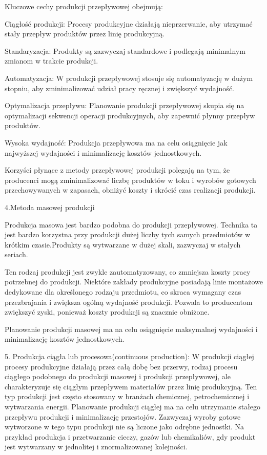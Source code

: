 Kluczowe cechy produkcji przepływowej obejmują:

    Ciągłość produkcji: Procesy produkcyjne działają nieprzerwanie, aby utrzymać stały przepływ produktów przez linię produkcyjną.

    Standaryzacja: Produkty są zazwyczaj standardowe i podlegają minimalnym zmianom w trakcie produkcji.

    Automatyzacja: W produkcji przepływowej stosuje się automatyzację w dużym stopniu, aby zminimalizować udział pracy ręcznej i zwiększyć wydajność.

    Optymalizacja przepływu: Planowanie produkcji przepływowej skupia się na optymalizacji sekwencji operacji produkcyjnych, aby zapewnić płynny przepływ produktów.

    Wysoka wydajność: Produkcja przepływowa ma na celu osiągnięcie jak najwyższej wydajności i minimalizację kosztów jednostkowych.

    
Korzyści płynące z metody przepływowej produkcji polegają na tym, że producenci mogą zminimalizować liczbę produktów w toku i wyrobów gotowych przechowywanych w zapasach, obniżyć koszty i skrócić czas realizacji produkcji.

4.Metoda masowej produkcji

Produkcja masowa jest bardzo podobna do produkcji przepływowej. Technika ta jest bardzo korzystna przy produkcji dużej liczby tych samych przedmiotów w krótkim czasie.Produkty są wytwarzane w dużej skali, zazwyczaj w stałych seriach.

Ten rodzaj produkcji jest zwykle zautomatyzowany, co zmniejsza koszty pracy potrzebnej do produkcji. Niektóre zakłady produkcyjne posiadają linie montażowe dedykowane dla określonego rodzaju przedmiotu, co skraca wymagany czas przezbrajania i zwiększa ogólną wydajność produkcji. Pozwala to producentom zwiększyć zyski, ponieważ koszty produkcji są znacznie obniżone.

Planowanie produkcji masowej ma na celu osiągnięcie maksymalnej wydajności i minimalizację kosztów jednostkowych.

    
 5. Produkcja ciągła lub procesowa(continuous production): W produkcji ciągłej procesy produkcyjne działają przez całą dobę bez przerwy, rodzaj procesu ciągłego podobnego do produkcji masowej i produkcji przepływowej, ale charakteryzuje się ciągłym przepływem materiałów przez linię produkcyjną. Ten typ produkcji jest często stosowany w branżach chemicznej, petrochemicznej i wytwarzania energii. Planowanie produkcji ciągłej ma na celu utrzymanie stałego przepływu produkcji i minimalizację przestojów.
 Zazwyczaj wyroby gotowe wytworzone w tego typu produkcji nie są liczone jako odrębne jednostki. Na przykład produkcja i przetwarzanie cieczy, gazów lub chemikaliów, gdy produkt jest wytwarzany w jednolitej i znormalizowanej kolejności.

